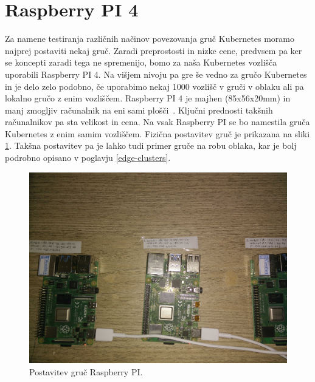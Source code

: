 \documentclass[a4paper, 12pt]{book}
\begin{document}
\section{Raspberry PI 4}
Za namene testiranja različnih načinov povezovanja gruč Kubernetes moramo najprej postaviti nekaj gruč.
Zaradi preprostosti in nizke cene, predvsem pa ker se koncepti zaradi tega ne spremenijo, bomo za naša Kubernetes vozlišča uporabili Raspberry PI 4.
Na višjem nivoju pa gre še vedno za gručo Kubernetes in je delo zelo podobno, če uporabimo nekaj 1000 vozlišč v gruči v oblaku ali pa lokalno gručo z enim vozliščem.
Raspberry PI 4 je majhen (85x56x20mm) in manj zmogljiv računalnik na eni sami plošči~\cite{rpi-tech-spec}.
Ključni prednosti takšnih računalnikov pa sta velikost in cena.
Na vsak Raspberry PI se bo namestila gruča Kubernetes z enim samim vozliščem.
Fizična postavitev gruč je prikazana na sliki \ref{rpi-gruce}.
Takšna postavitev pa je lahko tudi primer gruče na robu oblaka, kar je bolj podrobno opisano v poglavju \ref{edge-clusters}.
\begin{figure}[h]
\begin{center}
\includegraphics[width=1.0\textwidth]{images/postavitev-raspberry.jpg}
\end{center}
\caption{Postavitev gruč Raspberry PI.}
\label{rpi-gruce}
\end{figure}
\end{document}
